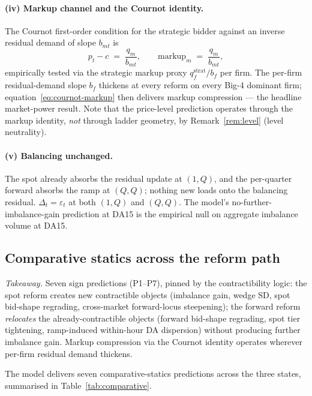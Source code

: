 \documentclass[11pt,a4paper]{article}
\theoremstyle{definition}
\theoremstyle{remark}
\theoremstyle{plain}
\begin{document}
\paragraph{(iv) Markup channel and the Cournot identity.} The Cournot first-order condition for the strategic bidder against an inverse residual demand of slope $b_{mt}$ is
\begin{equation}
p_t - c \;=\; \frac{q_m}{b_{mt}}, \qquad \text{markup}_m \;=\; \frac{q_m}{b_{mt}},
\label{eq:cournot-markup}
\end{equation}
empirically tested via the strategic markup proxy $q_f^{\text{strat}}/b_f$ per firm. The per-firm residual-demand slope $b_f$ thickens at every reform on every Big-4 dominant firm; equation~\eqref{eq:cournot-markup} then delivers markup compression --- the headline market-power result. Note that the price-level prediction operates through the markup identity, \emph{not} through ladder geometry, by Remark~\ref{rem:level} (level neutrality).

\paragraph{(v) Balancing unchanged.} The spot already absorbs the residual update at $(1,Q)$, and the per-quarter forward absorbs the ramp at $(Q,Q)$; nothing new loads onto the balancing residual. $\Delta_t = \varepsilon_t$ at both $(1,Q)$ and $(Q,Q)$. The model's no-further-imbalance-gain prediction at DA15 is the empirical null on aggregate imbalance volume at DA15.

\subsection{Comparative statics across the reform path}\label{sec:speaks}

\emph{Takeaway.} Seven sign predictions (P1--P7), pinned by the contractibility logic: the spot reform creates new contractible objects (imbalance gain, wedge SD, spot bid-shape regrading, cross-market forward-locus steepening); the forward reform \emph{relocates} the already-contractible objects (forward bid-shape regrading, spot tier tightening, ramp-induced within-hour DA dispersion) without producing further imbalance gain. Markup compression via the Cournot identity operates wherever per-firm residual demand thickens.

The model delivers seven comparative-statics predictions across the three states, summarised in Table~\ref{tab:comparative}.
\end{document}
